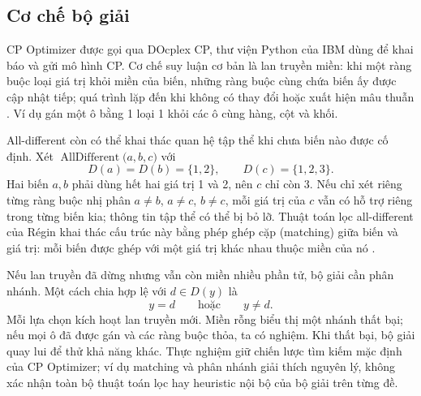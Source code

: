 \documentclass[a4paper]{cas-sc}
\newcommand{\AD}{\operatorname{AllDifferent}}
\begin{document}
\subsection{Cơ chế bộ giải}
CP Optimizer được gọi qua DOcplex CP, thư viện Python của IBM dùng để khai báo và gửi mô hình CP. Cơ chế suy luận cơ bản là lan truyền miền: khi một ràng buộc loại giá trị khỏi miền của biến, những ràng buộc cùng chứa biến ấy được cập nhật tiếp; quá trình lặp đến khi không có thay đổi hoặc xuất hiện mâu thuẫn \citep{ibmCP,ibmCPManual}. Ví dụ gán một ô bằng 1 loại 1 khỏi các ô cùng hàng, cột và khối.

All-different còn có thể khai thác quan hệ tập thể khi chưa biến nào được cố định. Xét $\AD\bigl(a,b,c\bigr)$ với
\begin{equation}\label{eq:hall-example}
D(a)=D(b)=\{1,2\},\qquad D(c)=\{1,2,3\}.
\end{equation}
Hai biến $a,b$ phải dùng hết hai giá trị 1 và 2, nên $c$ chỉ còn 3. Nếu chỉ xét riêng từng ràng buộc nhị phân $a\ne b$, $a\ne c$, $b\ne c$, mỗi giá trị của $c$ vẫn có hỗ trợ riêng trong từng biến kia; thông tin tập thể có thể bị bỏ lỡ. Thuật toán lọc all-different của Régin khai thác cấu trúc này bằng phép ghép cặp (matching) giữa biến và giá trị: mỗi biến được ghép với một giá trị khác nhau thuộc miền của nó \citep{regin1994}.
\begin{reportfigure}
\centering
\caption{Suy luận tập thể trong all-different. Hai biến $a,b$ dành hết tập $\{1,2\}$; bỏ các cạnh nét đứt từ $c$ đến 1 và 2 sẽ giữ lại duy nhất giá trị 3.}
\label{fig:hall}
\end{reportfigure}
Nếu lan truyền đã dừng nhưng vẫn còn miền nhiều phần tử, bộ giải cần phân nhánh. Một cách chia hợp lệ với $d\in D(y)$ là
\begin{equation}
y=d\qquad\text{hoặc}\qquad y\ne d.
\end{equation}
Mỗi lựa chọn kích hoạt lan truyền mới. Miền rỗng biểu thị một nhánh thất bại; nếu mọi ô đã được gán và các ràng buộc thỏa, ta có nghiệm. Khi thất bại, bộ giải quay lui để thử khả năng khác. Thực nghiệm giữ chiến lược tìm kiếm mặc định của CP Optimizer; ví dụ matching và phân nhánh giải thích nguyên lý, không xác nhận toàn bộ thuật toán lọc hay heuristic nội bộ của bộ giải trên từng đề.
\end{document}
